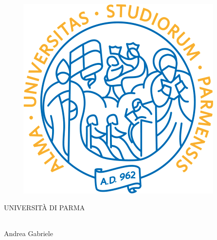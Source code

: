 
\begin{titlepage}
    \begin{figure}[!htb]
        \centering
        \includegraphics[keepaspectratio=true,scale=0.5]{uniprLogo.png}
    \end{figure}
    \begin{center}
        \LARGE{UNIVERSITÀ DI PARMA}
        \vspace{5mm}
        \\ \large{\Dipartimento}
        \vspace{5mm}
        \\ \LARGE{\Corso}
    \end{center}
    \vspace{20mm}
    \begin{center}
        {\LARGE{\textbf{\Insegnamento}}}
    \end{center}
    \vspace{55mm}
    \begin{center}
        {\LARGE{Andrea Gabriele}}
    \end{center}
    \hrulefill
    \vspace{2mm}
    \\
    
    
    \end{titlepage}
    
    
    \clearpage
    
    \fancyhead{}\fancyfoot{}
    \fancyhead[L]{\Insegnamento}
    \fancyhead[R]{\theauthor}
    
    \fancyfoot[R]{\thepage}
